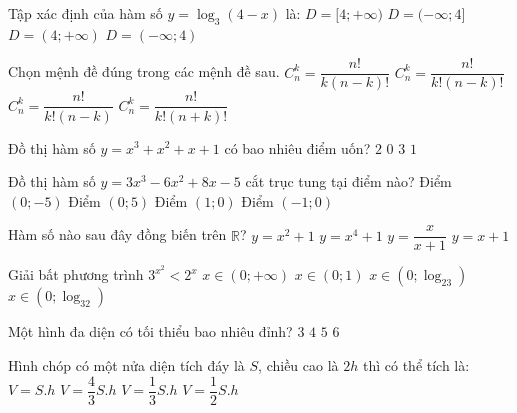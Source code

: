 \begin{ex}%
Tập xác định của hàm số $y=\log_3(4-x)$ là:
	\choice
	{$D= [4;+\infty)$}
	{$D=(-\infty;4] $}
	{$D=(4;+\infty)$}
	{\True $D=(-\infty;4)$}
\end{ex}

\begin{ex}%
Chọn mệnh đề đúng trong các mệnh đề sau.
	\choice
	{$C_n^k=\dfrac{n!}{k(n-k)!}$}
	{\True $C_n^k=\dfrac{n!}{k!(n-k)!}$}
	{$C_n^k=\dfrac{n!}{k!(n-k)}$}
	{$C_n^k=\dfrac{n!}{k!(n+k)!}$}
\end{ex}

\begin{ex}%
Đồ thị hàm số $y=x^3+x^2+x+1$ có bao nhiêu điểm uốn?
\choice
{$2$}
{$0$}
{$3$}
{\True $1$}
\end{ex}
\begin{ex}%
	Đồ thị hàm số $y=3x^3-6x^2+8x-5$ cắt trục tung tại điểm nào?
	\choice
	{\True Điểm $(0;-5)$}
	{Điểm $(0;5)$}
	{Điểm $(1;0)$}
	{Điểm $(-1;0)$}
\end{ex}
\begin{ex}%
	Hàm số nào sau đây đồng biến trên $\mathbb{R}$?
	\choice
	{$y=x^2+1$}
	{$y=x^4+1$}
	{$y=\dfrac{x}{x+1}$}
	{\True $y=x+1$}
\end{ex}
\begin{ex}%
	Giải bất phương trình $3^{x^2}<2^x$
	\choice
	{$x\in (0;+\infty)$}
	{$x\in (0;1)$}
	{$x\in (0;\log_23)$}
	{\True $x\in (0;\log_32)$}
\end{ex}
\begin{ex}%
	Một hình đa diện có tối thiểu bao nhiêu đỉnh?
	\choice
	{$3$}
	{\True $4$}
	{$5$}
	{$6$}
\end{ex}
\begin{ex}%
	Hình chóp có một nửa diện tích đáy là $S$, chiều cao là $2h$ thì có thể tích là:
	\choice
	{$V=S.h$}
	{\True $V=\dfrac{4}{3}S.h$}
	{$V=\dfrac{1}{3}S.h$}
	{$V=\dfrac{1}{2}S.h$}
\end{ex}
